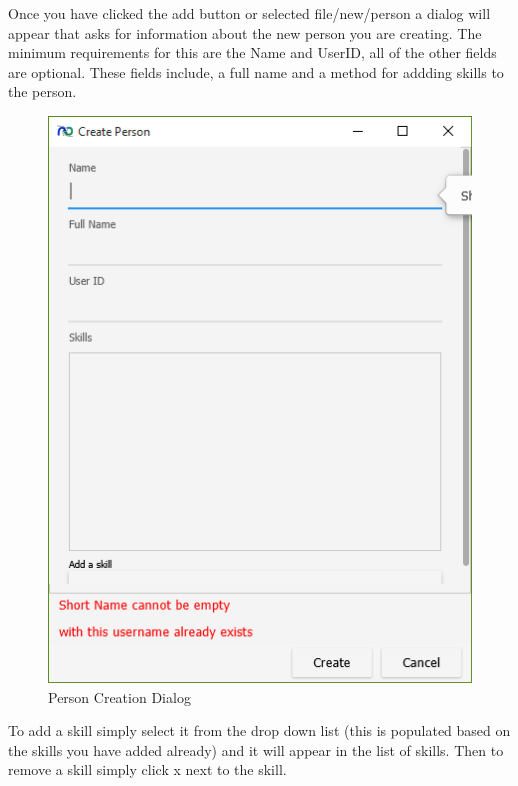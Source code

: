Once you have clicked the add button or selected file/new/person a dialog will appear that asks for information about the new person you are creating. The minimum requirements for this are the Name and UserID, all of the other fields are optional. These fields include, a full name and a method for addding skills to the person.

\begin{figure}[H]
\centering
\includegraphics[width=\textwidth]{images/screenshots/people2.PNG}
\caption{Person Creation Dialog}
\label{fig:new_project}
\end{figure}

To add a skill simply select it from the drop down list (this is populated based on the skills you have added already) and it will appear in the list of skills. Then to remove a skill simply click x next to the skill.

